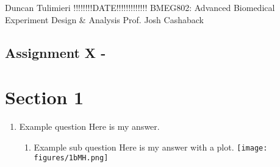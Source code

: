 \documentclass[12pt]{article}
\begin{document}
\noindent Duncan Tulimieri
\newline 
\noindent !!!!!!!!DATE!!!!!!!!!!!!!
\newline 
\noindent BMEG802: Advanced Biomedical Experiment Design \& Analysis
\newline 
\noindent Prof. Josh Cashaback 


\begin{center}
    \subsection*{Assignment X - }
\end{center}

\section*{Section 1}
\begin{enumerate}
    \item Example question \newline 
    Here is my answer. \newline
    \begin{enumerate}
        \item Example sub question \newline
        Here is my answer with a plot. \newline \texttt{[image: figures/1bMH.png]}
    \end{enumerate}
\end{enumerate}



\end{document}
